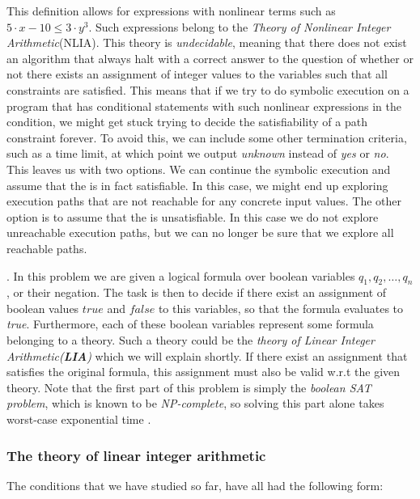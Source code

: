 	This definition allows for expressions with nonlinear terms such as $ 5\cdot x - 10 \leq 3 \cdot y^3$. Such expressions belong to the \emph{Theory of Nonlinear Integer Arithmetic}(NLIA). This theory is \emph{undecidable}, meaning that there does not exist an algorithm that always halt with a correct answer to the question of whether or not there exists an assignment of integer values to the variables such that all constraints are satisfied. This means that if we try to do symbolic execution on a program that has conditional statements with such nonlinear expressions in the condition, we might get stuck trying to decide the satisfiability of a path constraint forever. To avoid this, we can include some other termination criteria, such as a time limit, at which point we output \emph{unknown} instead of \emph{yes} or \emph{no}. This leaves us with two options. We can continue the symbolic execution and assume that the \pc is in fact satisfiable. In this case, we might end up exploring execution paths that are not reachable for any concrete input values. The other option is to assume that the \pc is unsatisfiable. In this case we do not explore unreachable execution paths, but we can no longer be sure that we explore all reachable paths.
	
	
	
	
	
	
	
	
	
	\iffalse. In this problem we are given a logical formula over boolean variables $q_1, q_2, \ldots, q_n$, or their negation. The task is then to decide if there exist an assignment of boolean values $true$ and $false$ to this variables, so that the formula evaluates to \emph{true}. Furthermore, each of these boolean variables represent some formula belonging to a theory. Such a theory could be the \emph{theory of Linear Integer Arithmetic(\textbf{LIA})} which we will explain shortly. If there exist an assignment that satisfies the original formula, this assignment must also be valid w.r.t the given theory. Note that the first part of this problem is simply the \emph{boolean SAT problem}, which is known to be \emph{NP-complete}, so solving this part alone takes worst-case exponential time \cite{DeMoura2011}.
	

	\subsubsection{The theory of linear integer arithmetic}
		The conditions that we have studied so far, have all had the following form:
		
